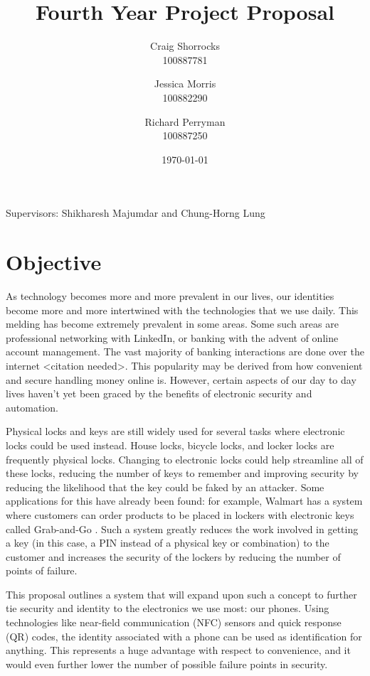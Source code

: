 \documentclass{article}
\title{Fourth Year Project Proposal}
\author{
	Craig Shorrocks \\
	100887781
	\and
	Jessica Morris \\
	100882290
	\and
	Richard Perryman \\
	100887250
}
\date{\today}
\begin{document}
\maketitle

\begin{center}
Supervisors: Shikharesh Majumdar and Chung-Horng Lung
\end{center}

\pagebreak

\tableofcontents

\pagebreak

\section{Objective}

As technology becomes more and more prevalent in our lives, our identities become more and more intertwined with the
technologies that we use daily. This melding has become extremely prevalent in some areas. Some such areas are
professional networking with LinkedIn, or banking with the advent of online account management. The vast majority of
banking interactions are done over the internet \textless citation needed\textgreater. This popularity may be derived
from how convenient and secure handling money online is. However, certain aspects of our day to day lives haven't yet
been graced by the benefits of electronic security and automation.

Physical locks and keys are still widely used for several tasks where electronic locks could be used instead. House
locks, bicycle locks, and locker locks are frequently physical locks. Changing to electronic locks could help streamline
all of these locks, reducing the number of keys to remember and improving security by reducing the likelihood that the
key could be faked by an attacker. Some applications for this have already been found: for example, Walmart has a
system where customers can order products to be placed in lockers with electronic keys called Grab-and-Go
\autocite{WALMART}. Such a system greatly reduces the work involved in getting a key (in this case, a PIN instead
of a physical key or combination) to the customer and increases the security of the lockers by reducing the number
of points of failure.

This proposal outlines a system that will expand upon such a concept to further tie security and identity to the
electronics we use most: our phones. Using technologies like near-field communication (NFC) sensors and quick response
(QR) codes, the identity associated with a phone can be used as identification for anything. This represents a huge
advantage with respect to convenience, and it would even further lower the number of possible failure points in
security.
\end{document}
